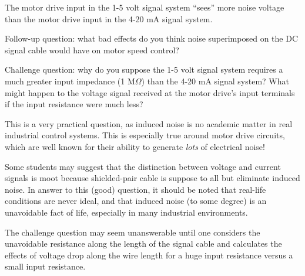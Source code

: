 
The motor drive input in the 1-5 volt signal system ``sees'' more noise voltage than the motor drive input in the 4-20 mA signal system.

\vskip 10pt

Follow-up question: what bad effects do you think noise superimposed on the DC signal cable would have on motor speed control?

\vskip 10pt

Challenge question: why do you suppose the 1-5 volt signal system requires a much greater input impedance (1 M$\Omega$) than the 4-20 mA signal system?  What might happen to the voltage signal received at the motor drive's input terminals if the input resistance were much less?







This is a very practical question, as induced noise is no academic matter in real industrial control systems.  This is especially true around motor drive circuits, which are well known for their ability to generate {\it lots} of electrical noise!

Some students may suggest that the distinction between voltage and current signals is moot because shielded-pair cable is suppose to all but eliminate induced noise.  In answer to this (good) question, it should be noted that real-life conditions are never ideal, and that induced noise (to some degree) is an unavoidable fact of life, especially in many industrial environments.

The challenge question may seem unanswerable until one considers the unavoidable resistance along the length of the signal cable and calculates the effects of voltage drop along the wire length for a huge input resistance versus a small input resistance.




